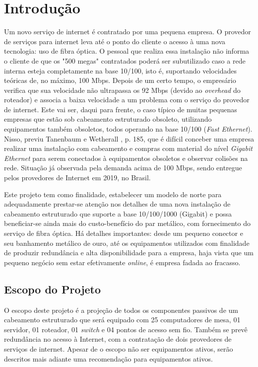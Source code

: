 \documentclass[	DIV=calc,%
							paper=a4,%
							fontsize=12pt,%
							onecolumn]{scrartcl}	 					%
\begin{document}
\clearpage
\renewcommand{\contentsname}{Sumário}
\tableofcontents
\clearpage

\section{Introdução}

Um novo serviço de internet é contratado por uma pequena empresa. O provedor de serviços para internet leva até o ponto do cliente o acesso à uma nova tecnologia: uso de fibra óptica. O pessoal que realiza essa instalação não informa o cliente de que os "500 megas" contratados poderá ser subutilizado caso a rede interna esteja completamente na base 10/100, isto é, suportando velocidades teóricas de, no máximo, 100 Mbps. Depois de um certo tempo, o empresário verifica que sua velocidade não ultrapassa os 92 Mbps (devido ao \textit{overhead} do roteador) e associa a baixa velocidade a um problema com o serviço do provedor de internet. Este vai ser, daqui para frente, o caso típico de muitas pequenas empresas que estão sob cabeamento estruturado obsoleto, utilizando equipamentos também obsoletos, todos operando na base 10/100 (\textit{Fast Ethernet}). Nisso, previu Tanenbaum e Wetherall \cite{t2013}, p. 185, que é difícil conceber uma empresa realizar uma instalação com cabeamento e compras com material do nível \textit{Gigabit Ethernet} para serem conectados à equipamentos obsoletos e observar colisões na rede. Situação já observada pela demanda acima de 100 Mbps, sendo entregue pelos provedores de Internet em 2019, no Brasil.

\bigskip

Este projeto tem como finalidade, estabelecer um modelo de norte para adequadamente prestar-se atenção nos detalhes de uma nova instalação de cabeamento estruturado que suporte a base 10/100/1000 (Gigabit) e possa beneficiar-se ainda mais do custo-benefício do par metálico, com fornecimento do serviço de fibra óptica. Há detalhes importantes: desde um pequeno conector e seu banhamento metálico de ouro, até os equipamentos utilizados com finalidade de produzir redundância e alta disponibilidade para a empresa, haja vista que um pequeno negócio sem estar efetivamente \textit{online}, é empresa fadada ao fracasso.
\bigskip

\subsection{Escopo do Projeto}
O escopo deste projeto é a projeção de todos os componentes passivos de um cabeamento estruturado que será equipado com 25 computadores de mesa, 01 servidor, 01 roteador, 01 \textit{switch} e 04 pontos de acesso sem fio. Também se prevê redundância no acesso à Internet, com a contratação de dois provedores de serviços de internet. Apesar de o escopo não ser equipamentos ativos, serão descritos mais adiante uma recomendação para equipamentos ativos.
\end{document}
